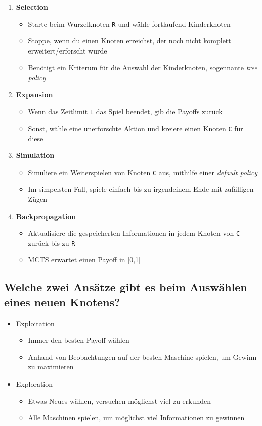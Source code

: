 \documentclass[a4paper]{article}
\begin{document}
		\begin{enumerate}
			\item \textbf{Selection}
			\begin{itemize}
				\item Starte beim Wurzelknoten \texttt{R} und wähle fortlaufend Kinderknoten
				\item Stoppe, wenn du einen Knoten erreichst, der noch nicht komplett erweitert/erforscht wurde
				\item Benötigt ein Kriterum für die Auswahl der Kinderknoten, sogennante \textit{tree policy}
			\end{itemize}
			\item \textbf{Expansion}
			\begin{itemize}
				\item Wenn das Zeitlimit \texttt{L} das Spiel beendet, gib die Payoffs zurück
				\item Sonst, wähle eine unerforschte Aktion und kreiere einen Knoten \texttt{C} für diese
			\end{itemize}
			\item \textbf{Simulation}
			\begin{itemize}
				\item Simuliere ein Weiterspielen von Knoten \texttt{C} aus, mithilfe einer \textit{default policy}
				\item Im simpelsten Fall, spiele einfach bis zu irgendeinem Ende mit zufälligen Zügen
			\end{itemize}
			\item \textbf{Backpropagation}
			\begin{itemize}
				\item Aktualisiere die gespeicherten Informationen in jedem Knoten von \texttt{C} zurück bis zu \texttt{R}
				\item MCTS erwartet einen Payoff in [0,1]
			\end{itemize}
		\end{enumerate}
	
		\subsection{Welche zwei Ansätze gibt es beim Auswählen eines neuen Knotens?}
		
		\begin{itemize}
			\item Exploitation
			\begin{itemize}
				\item Immer den besten Payoff wählen
				\item Anhand von Beobachtungen auf der besten Maschine spielen, um Gewinn zu maximieren
			\end{itemize}
			\item Exploration
			\begin{itemize}
				\item Etwas Neues wählen, versuchen möglichst viel zu erkunden
				\item Alle Maschinen spielen, um möglichst viel Informationen zu gewinnen
			\end{itemize}
		\end{itemize}
	
\end{document}
